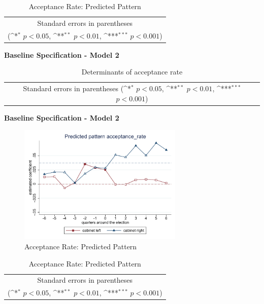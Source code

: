 \documentclass[10pt,a4paper]{scrartcl}
\begin{document}
\begin{table}[!ht]\centering
\renewcommand{\arraystretch}{1.25}
\def\sym#1{\ifmmode^{#1}\else\(^{#1}\)\fi}
\caption{Acceptance Rate: Predicted Pattern}
\begin{tabular}[]{l*{2}{c}}
	\hline\hline
	
	\hline\hline
	\multicolumn{3}{c}{\footnotesize Standard errors in parentheses} \\
	\multicolumn{3}{c}{\footnotesize (\sym{*} \(p<0.05\), \sym{**} \(p<0.01\), \sym{***} \(p<0.001\))}\\
\end{tabular}
\end{table}

\clearpage
\textbf{Baseline Specification - Model 2}
\begin{table}[!ht]\centering
	\scriptsize
	\renewcommand{\arraystretch}{1.1}
	\def\sym#1{\ifmmode^{#1}\else\(^{#1}\)\fi}
	\caption{Determinants of acceptance rate}
	\begin{tabular}{l*{3}{c}}
		\hline\hline
		
		\hline\hline
		\multicolumn{4}{c}{\footnotesize Standard errors in parentheses (\sym{*} \(p<0.05\), \sym{**} \(p<0.01\), \sym{***} \(p<0.001\))}\\
	\end{tabular}
\end{table}


\clearpage
\textbf{Baseline Specification - Model 2}
\begin{figure}[!ht]
	\centering
	\includegraphics[width=0.7\textwidth]{figures_edited/acceptance_rate_graph2_baseline.pdf}
	\caption{Acceptance Rate: Predicted Pattern}
\end{figure}

\begin{table}[!ht]\centering
	\footnotesize
	\renewcommand{\arraystretch}{1.2}
	\def\sym#1{\ifmmode^{#1}\else\(^{#1}\)\fi}
	\caption{Acceptance Rate: Predicted Pattern}
	\begin{tabular}{l*{2}{c}}
		\hline\hline
		
		\hline\hline
		\multicolumn{3}{c}{\footnotesize Standard errors in parentheses} \\
		\multicolumn{3}{c}{\footnotesize (\sym{*} \(p<0.05\), \sym{**} \(p<0.01\), \sym{***} \(p<0.001\))}\\
	\end{tabular}
\end{table}
\end{document}

